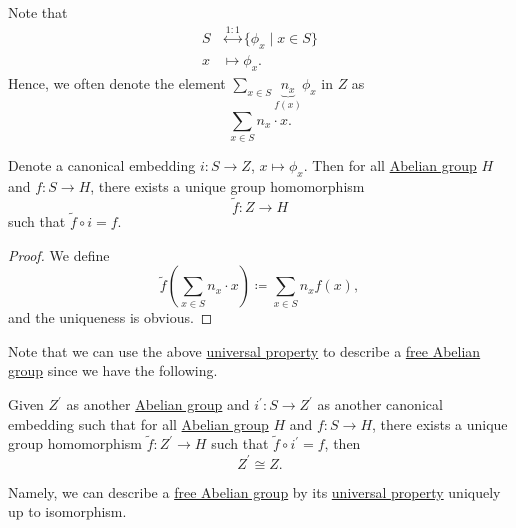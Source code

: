 \begin{note}
	Note that
	\[
		\begin{split}
			S & \overset{1:1}{\longleftrightarrow} \{\phi _{x} \mid x\in S\} \\
			x & \mapsto \phi _{x}.
		\end{split}
	\]
	Hence, we often denote the element \(\sum\limits_{x\in S}^{} \underbrace{n_{x}}_{f(x)} \phi _{x} \) in \(Z\) as
	\[
		\sum\limits_{x\in S}n_{x} \cdot x.
	\]
\end{note}
\begin{theorem}\label{thm:universal-property-of-free-Abelian-group-generated-by-a-set}
	Denote a canonical embedding \(i\colon S\to Z\), \(x\mapsto \phi _{x} \). Then for all \hyperref[def:Abelian-group]{Abelian group} \(H\) and \(f\colon S\to H\), there exists a unique group homomorphism
	\[
		\widetilde{f} \colon Z\to H
	\]
	such that \(\widetilde{f} \circ i = f\).
\end{theorem}
\begin{proof}
	We define
	\[
		\widetilde{f} \left(\sum\limits_{x\in S}^{} n_{x} \cdot x\right)\coloneqq \sum\limits_{x\in S}n_{x} f(x),
	\]
	and the uniqueness is obvious.
\end{proof}

Note that we can use the above \hyperref[thm:universal-property-of-free-Abelian-group-generated-by-a-set]{universal property} to describe a
\hyperref[def:free-Abelian-group]{free Abelian group} since we have the following.
\begin{proposition}
	Given \(Z^\prime \) as another \hyperref[def:Abelian-group]{Abelian group} and \(i^\prime \colon S\to Z^\prime \) as another canonical embedding such that for all \hyperref[def:Abelian-group]{Abelian group} \(H\)
	and \(f\colon S\to H\), there exists a unique group homomorphism \(\widetilde{f} \colon Z^\prime \to H\) such that \(\widetilde{f} \circ i^\prime = f\), then
	\[
		Z^\prime \cong Z.
	\]
\end{proposition}

Namely, we can describe a \hyperref[def:free-Abelian-group]{free Abelian group} by its \hyperref[thm:universal-property-of-free-Abelian-group-generated-by-a-set]{universal property}
uniquely up to isomorphism.

